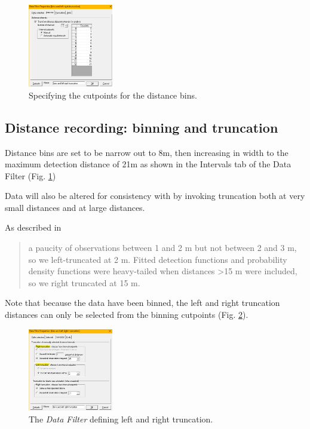 \documentclass[a4paper, 10pt]{article}
\begin{document}
\begin{figure}
\includegraphics[width=0.33\textwidth]{images/bins-datafilter.png}
\caption{Specifying the cutpoints for the distance bins. \label{fig:bins}}
\vspace{-25pt}
\end{figure}

\subsection{Distance recording: binning and truncation}

Distance bins are set to be narrow out to 8m, then increasing in width to the maximum detection distance of 21m as shown in the Intervals tab of the Data Filter (Fig. \ref{fig:bins})

Data will also be altered for consistency with \citep{howeetal} by invoking truncation both at very small distances and at large distances.

As described in \citet{howeetal}
\begin{quotation}
a paucity of observations between 1 and 2 m but not between 2 and 3 m, so we left-truncated at 2 m. Fitted detection functions and probability density functions were heavy-tailed when distances >15 m were included, so we right truncated at 15 m.
\end{quotation}

Note that because the data have been binned, the left and right truncation distances can only be selected from the binning cutpoints (Fig. \ref{fig:truncation}).

\begin{figure}
\includegraphics[width=0.33\textwidth]{images/truncation-datafilter.png}
\caption{The \emph{Data Filter} defining left and right truncation. \label{fig:truncation}}
\vspace{-25pt}
\end{figure}
\end{document}
